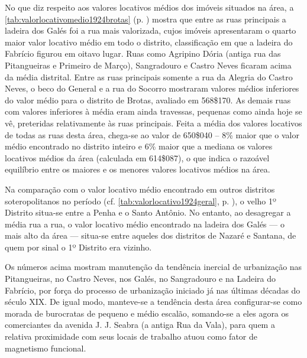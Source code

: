 
No que diz respeito aos valores locativos médios dos imóveis situados na área, a \autoref{tab:valorlocativomedio1924brotas} (p. \pageref{tab:valorlocativomedio1924brotas}) mostra que entre as ruas principais a ladeira dos Galés foi a rua mais valorizada, cujos imóveis apresentaram o quarto maior valor locativo médio em todo o distrito, classificação em que a ladeira do Fabrício figurou em oitavo lugar. Ruas como Agripino Dória (antiga rua das Pitangueiras e Primeiro de Março), Sangradouro e Castro Neves ficaram acima da média distrital. Entre as ruas principais somente a rua da Alegria do Castro Neves, o beco do General e a rua do Socorro mostraram valores médios inferiores do valor médio para o distrito de Brotas, avaliado em 568\$170. As demais ruas com valores inferiores à média eram ainda travessas, pequenas como ainda hoje se vê, preteridas relativamente às ruas principais. Feita a média dos valores locativos de todas as ruas desta área, chega-se ao valor de 650\$040 -- 8\% maior que o valor médio encontrado no distrito inteiro e 6\% maior que a mediana os valores locativos médios da área (calculada em 614\$087), o que indica o razoável equilíbrio entre os maiores e os menores valores locativos médios na área.

Na comparação com o valor locativo médio encontrado em outros distritos soteropolitanos no período (cf. \autoref{tab:valorlocativo1924geral}, p. \pageref{tab:valorlocativo1924geral}), o velho 1º Distrito situa-se entre a Penha e o Santo Antônio. No entanto, ao desagregar a média rua a rua, o valor locativo médio encontrado na ladeira dos Galés --- o mais alto da área --- situa-se entre aqueles dos distritos de Nazaré e Santana, de quem por sinal o 1º Distrito era vizinho.


Os números acima mostram manutenção da tendência inercial de urbanização nas Pitangueiras, no Castro Neves, nos Galés, no Sangradouro e na Ladeira do Fabrício, por força do processo de urbanização iniciado já nas últimas décadas do século XIX. De igual modo, manteve-se a tendência desta área configurar-se como morada de burocratas de pequeno e médio escalão, somando-se a eles agora os comerciantes da avenida J. J. Seabra (a antiga Rua da Vala), para quem a relativa proximidade com seus locais de trabalho atuou como fator de magnetismo funcional.


